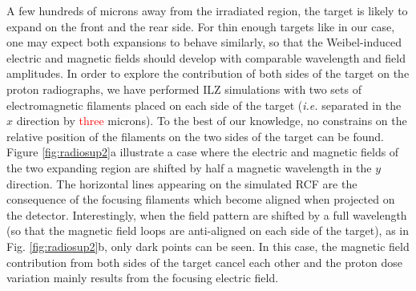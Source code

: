 \documentclass[aps,showpacs,superscriptaddress]{revtex4}
\begin{document}
A few hundreds of microns away from the irradiated region, the target is likely to expand on the front and the rear side. 
For thin enough targets like in our case, one may expect both expansions to behave similarly, so that the  Weibel-induced electric and magnetic fields should develop with comparable wavelength and field amplitudes. 
In order to explore the contribution of both  sides of the target on the proton radiographs, we have performed ILZ simulations with two  sets of electromagnetic filaments placed on each side of the target (\emph{i.e.} separated in the $x$ direction by \textcolor{red}{three} microns).
To the best of our knowledge, no constrains on the relative position of the filaments on the two sides of the target can be found. 
Figure \ref{fig:radiosup2}a illustrate a case where the electric and magnetic fields of the two expanding region are shifted by half a magnetic wavelength in the $y$ direction. The horizontal lines appearing on the simulated RCF are the consequence of the focusing filaments which become aligned when projected on the detector.
Interestingly, when the field pattern are shifted by a full wavelength (so that the magnetic field loops are anti-aligned on each side of the target), as in Fig. \ref{fig:radiosup2}b, only dark points can be seen. In this case, the magnetic field contribution from both sides of the target cancel each other and the proton dose variation mainly results from the focusing electric field. 
\end{document}

